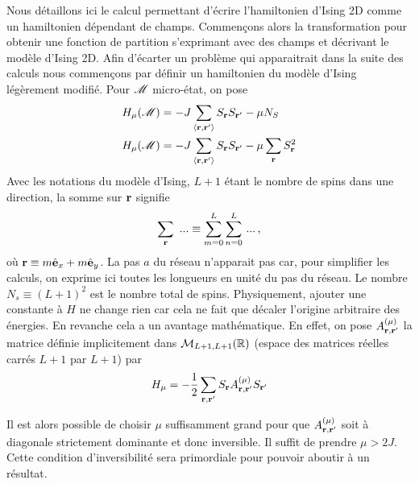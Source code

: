\documentclass[10.5pt]{article}
\begin{document}
\begin{multicols}{2}
Nous détaillons ici le calcul permettant d'écrire l'hamiltonien d'Ising 2D comme un hamiltonien dépendant de champs. Commençons alors la transformation pour obtenir une fonction de partition s'exprimant avec des champs et décrivant le modèle d'Ising 2D. Afin d'écarter un problème qui apparaitrait dans la suite des calculs nous commençons par définir un hamiltonien du modèle d'Ising légèrement modifié. Pour $\mathscr{M}$ micro-état, on pose 
\begin{align}
  H_\mu(\mathscr{M}) &= -J \sum_{\left<{\bf r}, {\bf r}'\right>}S_{\bf r} S_{{\bf r}'} - \mu N_S \\
  H_\mu(\mathscr{M})   &= -J\sum_{\left<{\bf r}, {\bf r}'\right>}S_{\bf r} S_{{\bf r}'} - \mu \sum_{\bf r} S_{\bf r}^2 
\end{align}
Avec les notations du modèle d'Ising, $L+1$ étant le nombre de spins dans une direction, la somme sur ${\bf r}$ signifie
\begin{equation}
\sum_{\bf r} \,\, ... \equiv \sum_{m=0}^{L}\sum_{n=0}^{L} \, ... \, ,
\end{equation}
où ${\bf r} \equiv m\hat{\mathbf{e}}_x + m\hat{\mathbf{e}}_y$. La pas $a$ du réseau n'apparait pas car, pour simplifier les calculs, on exprime ici toutes les longueurs en unité du pas du réseau. Le nombre $N_s \equiv (L+1)^2$ est le nombre total de spins. Physiquement, ajouter une constante à $H$ ne change rien car cela ne fait que décaler l'origine arbitraire des énergies. En revanche cela a un avantage mathématique. En effet, on pose $A_{{\bf r}, {\bf r}'}^{(\mu)}$ la matrice définie implicitement dans $\mathcal{M}_{L+1, L+1}(\mathbb{R})$ (espace des matrices réelles carrés $L+1$ par $L+1$) par
\begin{equation}
  H_\mu  = -\frac{1}{2} \sum_{{\bf r}, {\bf r}'} S_{\bf r} A_{{\bf r}, {\bf r}'}^{(\mu)}S_{{\bf r}'}
\end{equation}

Il est alors possible de choisir $\mu$ suffisamment grand pour que $A_{{\bf r}, {\bf r}'}^{(\mu)}$ soit à diagonale strictement dominante et donc inversible. Il suffit de prendre $\mu > 2J$. Cette condition d'inversibilité sera primordiale pour pouvoir aboutir à un résultat.\\



\end{multicols}
\end{document}
